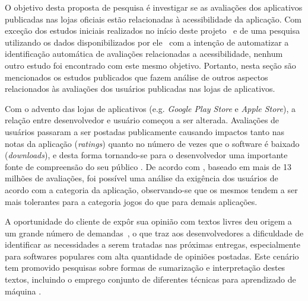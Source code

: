 O objetivo desta proposta de pesquisa é investigar se as avaliações dos aplicativos publicadas nas lojas oficiais estão relacionadas à acessibilidade da aplicação. Com exceção dos estudos iniciais realizados no início deste projeto~\cite{ihc2019} e de uma pesquisa utilizando os dados disponibilizados por ele~\cite{rochestertamjeed} com a intenção de automatizar a identificação automática de avaliações relacionadas a acessibilidade, nenhum outro estudo foi encontrado com este mesmo objetivo. 
Portanto, nesta seção são mencionados os estudos publicados que fazem análise de outros aspectos relacionados às avaliações dos usuários publicadas nas lojas de aplicativos. 


Com o advento das lojas de aplicativos (e.g. \textit{Google Play Store} e \textit{Apple Store}),
a relação entre desenvolvedor e usuário começou a ser alterada. Avaliações de usuários passaram a ser postadas publicamente causando impactos tanto nas notas da aplicação (\textit{ratings}) quanto no número de vezes que o software é baixado (\textit{downloads}), e desta forma tornando-se para o desenvolvedor uma importante fonte de compreensão do seu público \cite{Pagano2013userfeedback}. De acordo com \cite{Fu2013whypeoplehate}, baseado em mais de 13 milhões de avaliações, foi possível uma análise da exigência dos usuários de acordo com a categoria da aplicação, observando-se que os mesmos tendem a ser mais tolerantes para a categoria jogos do que para demais aplicações.

A oportunidade do cliente de expôr sua opinião com textos livres deu origem a um grande número de demandas~\cite{Mcilroy2016analyzing}, o que traz aos desenvolvedores a dificuldade de identificar as necessidades a serem tratadas nas próximas entregas, especialmente para softwares populares com alta quantidade de opiniões postadas. Este cenário tem promovido pesquisas sobre formas de sumarização \cite{Iacob2013retrieving,Iacob2014online,Fu2013whypeoplehate} e interpretação destes textos, incluindo o emprego conjunto de diferentes técnicas para aprendizado de máquina \cite{Panichella2015how}.

